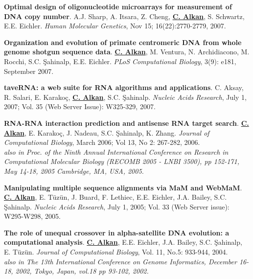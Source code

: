 \documentclass[margin,line]{res}
\begin{document}
\begin{resume}
\vspace{-.2cm}
 {\bf Optimal design of oligonucleotide microarrays for measurement of DNA copy number}.
 A.J. Sharp, A. Itsara, Z. Cheng, {\bf {\underline{C. Alkan}}}, S. Schwartz, E.E. Eichler.
 {\em Human Molecular Genetics}, Nov 15; 16(22):2770-2779, 2007.


\vspace{-.2cm}
 {\bf Organization and evolution of primate centromeric DNA from whole genome shotgun sequence data}.
 {\bf {\underline{C. Alkan}}}, M. Ventura, N. Archidiacono, M. Rocchi, S.C. \c{S}ahinalp, E.E. Eichler.
 {\em PLoS Computational Biology}, 3(9): e181, September 2007.


\vspace{-.2cm}
 {\bf taveRNA: a web suite for RNA algorithms and applications}.
  C. Aksay, R. Salari, E. Karako\c{c}, {\bf {\underline{C. Alkan}}}, S.C. \c{S}ahinalp.
  {\em Nucleic Acids Research}, July 1, 2007; Vol. 35 (Web Server Issue): W325-329, 2007.

\vspace{-.2cm}
 {\bf RNA-RNA interaction prediction and antisense RNA target search}.
  {\bf {\underline{C. Alkan}}}, E. Karako\c{c}, J. Nadeau, S.C. \c{S}ahinalp,
  K. Zhang.
  {\em Journal of Computational Biology}, March 2006; Vol 13, No 2: 267-282, 2006.\\
\hspace*{1cm} {\footnotesize {\it also in Proc. of the Ninth Annual International Conference on Research in Computational Molecular Biology
    (RECOMB 2005 - LNBI 3500), pp 152-171, 
    May 14-18, 2005 Cambridge, MA, USA, 2005.}}


\vspace{-.2cm}
{\bf Manipulating multiple sequence alignments via MaM and  WebMaM}.
{\bf {\underline{C. Alkan}}}, E. T\"{u}z\"{u}n, J. Buard, F. Lethiec,
E.E. Eichler, J.A. Bailey, S.C. \c{S}ahinalp.
{\em Nucleic Acids Research}, July 1, 2005; Vol. 33 (Web Server issue):
W295-W298, 2005.

\vspace{-.2cm}
 {\bf The role of unequal crossover in alpha-satellite 
   DNA evolution: a computational analysis}.
  {\bf {\underline{C. Alkan}}}, E.E. Eichler, J.A. Bailey, S.C. \c{S}ahinalp, E. T\"{u}z\"{u}n.
  {\em Journal of Computational Biology}, Vol. 11, No.5: 933-944, 2004.\\
\hspace*{1cm}  {\footnotesize {\it also in The 13th International Conference on Genome Informatics, 
December 16-18, 2002, Tokyo, Japan, vol.18 pp 93-102, 2002.}}


\end{resume}
\end{document}
